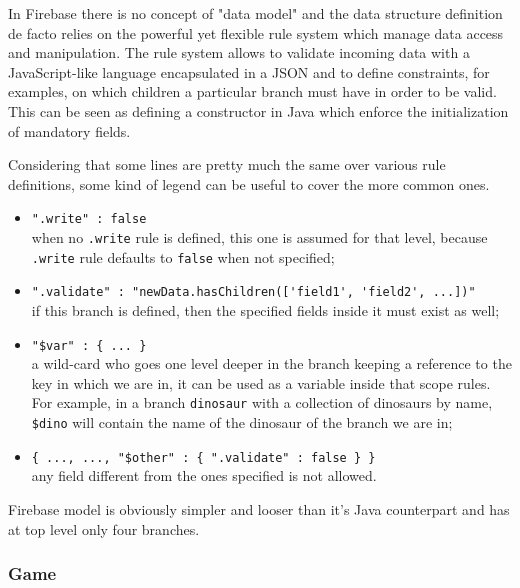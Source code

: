 			In Firebase there is no concept of "data model" and the data structure definition de facto relies on the powerful yet flexible rule system which manage data access and manipulation.
			The rule system allows to validate incoming data with a JavaScript-like language encapsulated in a JSON and to define constraints, for examples, on which children a particular branch must have in order to be valid. This can be seen as defining a constructor in Java which enforce the initialization of mandatory fields.
			
			Considering that some lines are pretty much the same over various rule definitions, some kind of legend can be useful to cover the more common ones.
			
			\begin{itemize}
				\item \lstinline|".write" : false| \\ when no \lstinline|.write| rule is defined, this one is assumed for that level, because \lstinline|.write| rule defaults to \lstinline|false| when not specified;
				\item \lstinline|".validate" : "newData.hasChildren(['field1', 'field2', ...])"| \\ if this branch is defined, then the specified fields inside it must exist as well;
				\item \lstinline|"$var" : { ... }| \\ a wild-card who goes one level deeper in the branch keeping a reference to the key in which we are in, it can be used as a variable inside that scope rules. For example, in a branch \lstinline|dinosaur| with a collection of dinosaurs by name, \lstinline|$dino| will contain the name of the dinosaur of the branch we are in;
				\item \lstinline|{ ..., ..., "$other" : { ".validate" : false } }| \\ any field different from the ones specified is not allowed.
			\end{itemize}
			
			Firebase model is obviously simpler and looser than it's Java counterpart and has at top level only four branches.
			
			
			\subsubsection{Game}
			
				
				
